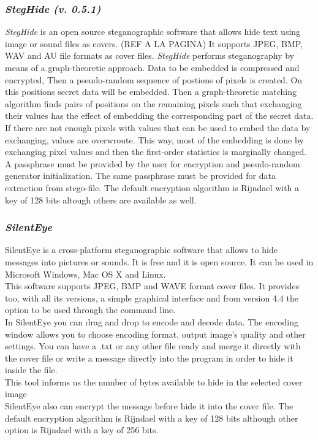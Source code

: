 \documentclass[11pt]{article}
\begin{document}
\subsubsection{\textit{}}

\subsubsection{\textit{StegHide (v. 0.5.1)}}
\textit{StegHide} is an open source steganographic software that allows hide text using image or sound files as covers. (REF A LA PAGINA)
It supports JPEG, BMP, WAV and AU file formats as cover files. 
\textit{StegHide} performs steganography by means of a graph-theoretic approach. Data to be embedded is compressed and encrypted,
Then a pseudo-random sequence of postions of pixels is created. On this positions secret data will be embedded. Then a
graph-theoretic  matching  algorithm finds pairs of positions on the remaining pixels such that exchanging their values has
the effect of embedding the corresponding  part of the secret data. If there are not enough pixels with values that can be used
to embed the data by exchanging, values are overwroute. This way, most of the embedding  is  done  by  exchanging  pixel  values
and then the first-order statistics is marginally changed. A passphrase must be provided by the user for encryption and
pseudo-random generator initialization. The same passphrase must be provided for data extraction from stego-file. The default
encryption algorithm is Rijndael with a key of 128 bits altough others are available as well.




\subsubsection{\textit{SilentEye}}
SilentEye is a cross-platform steganographic software that allows to hide messages into pictures or sounds. It is free and it is open source. It can be used in Microsoft Windows, Mac OS X and Linux. \\
This software supports JPEG, BMP and WAVE format cover files. It provides too, with all its versions, a simple graphical interface and from version 4.4 the option to be used through the command line. \\
In SilentEye you can drag and drop to encode and decode data. The encoding window allows you to choose encoding format, output image’s quality and other settings. You can have a .txt or any other file ready and merge it directly with the cover file or write a message directly into the program in order to hide it inside the file.\\
This tool informs us the number of bytes available to hide in the selected cover image \\
SilentEye also can encrypt the message before hide it into the cover file. The default encryption algorithm is Rijndael with a key of 128 bits although other option is Rijndael with a key of 256 bits.
\end{document}
